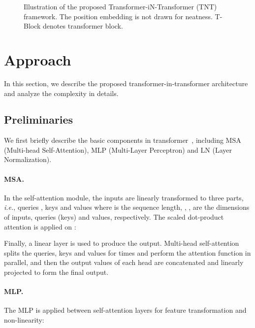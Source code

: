 \documentclass{article}
\begin{document}
\begin{figure*}[t]
	\centering	
	\caption{Illustration of the proposed Transformer-iN-Transformer (TNT) framework. The position embedding is not drawn for neatness. T-Block denotes transformer block.}
	\label{Fig:tnt}
\end{figure*}


\section{Approach}
\label{sec:method}
In this section, we describe the proposed transformer-in-transformer architecture and analyze the complexity in details.

\subsection{Preliminaries}
We first briefly describe the basic components in transformer~\cite{Att}, including MSA (Multi-head Self-Attention), MLP (Multi-Layer Perceptron) and LN (Layer Normalization).

\paragraph{MSA.}
In the self-attention module, the inputs  are linearly transformed to three parts, \emph{i.e.}, queries , keys  and values  where  is the sequence length, , ,  are the dimensions of inputs, queries (keys) and values, respectively. The scaled dot-product attention is applied on :

Finally, a linear layer is used to produce the output. Multi-head self-attention splits the queries, keys and values for  times and perform the attention function in parallel, and then the output values of each head are concatenated and linearly projected to form the final output.

\paragraph{MLP.}
The MLP is applied between self-attention layers for feature transformation and non-linearity:
\end{document}
